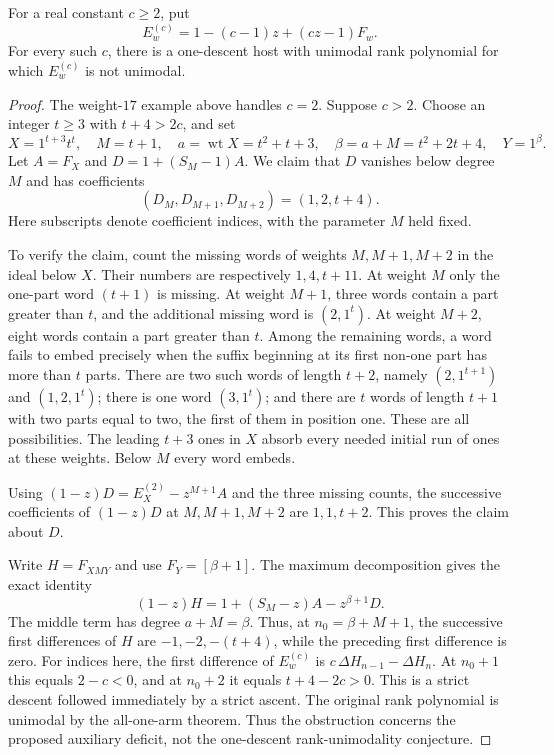 \begin{theorem}
For a real constant $c\ge2$, put
\[
 E^{(c)}_w=1-(c-1)z+(cz-1)F_w.
\]
For every such $c$, there is a one-descent host with unimodal rank
polynomial for which $E^{(c)}_w$ is not unimodal.
\end{theorem}
\begin{proof}
The weight-$17$ example above handles $c=2$. Suppose $c>2$.
Choose an integer $t\ge3$ with $t+4>2c$, and set
\[
 X=1^{t+3}t^t,\quad M=t+1,\quad
 a=\operatorname{wt}X=t^2+t+3,\quad
 \beta=a+M=t^2+2t+4,\quad Y=1^\beta.
\]
Let $A=F_X$ and $D=1+(S_M-1)A$. We claim that $D$ vanishes
below degree $M$ and has coefficients
\[
 (D_M,D_{M+1},D_{M+2})=(1,2,t+4).
\]
Here subscripts denote coefficient indices, with the parameter
$M$ held fixed.

To verify the claim, count the missing words of weights
$M,M+1,M+2$ in the ideal below $X$. Their numbers are respectively
$1,4,t+11$. At weight $M$ only the one-part word $(t+1)$ is
missing. At weight $M+1$, three words contain a part greater than
$t$, and the additional missing word is $(2,1^t)$.
At weight $M+2$, eight words contain a part greater than $t$.
Among the remaining words, a word fails to embed precisely when
the suffix beginning at its first non-one part has more than $t$
parts. There are two such words of length $t+2$, namely
$(2,1^{t+1})$ and $(1,2,1^t)$; there is one word $(3,1^t)$;
and there are $t$ words of length $t+1$ with two parts equal to
two, the first of them in position one. These are all possibilities.
The leading $t+3$ ones in $X$ absorb every needed initial run of
ones at these weights. Below $M$ every word embeds.

Using $(1-z)D=E^{(2)}_X-z^{M+1}A$ and the three missing counts,
the successive coefficients of $(1-z)D$ at $M,M+1,M+2$ are
$1,1,t+2$. This proves the claim about $D$.

Write $H=F_{XMY}$ and use $F_Y=[\beta+1]$. The maximum
decomposition gives the exact identity
\[
 (1-z)H=1+(S_M-z)A-z^{\beta+1}D.
\]
The middle term has degree $a+M=\beta$. Thus, at
$n_0=\beta+M+1$, the successive first differences of $H$ are
$-1,-2,-(t+4)$, while the preceding first difference is zero.
For indices here, the first difference of $E^{(c)}_w$ is
$c\,\Delta H_{n-1}-\Delta H_n$. At $n_0+1$ this equals
$2-c<0$, and at $n_0+2$ it equals $t+4-2c>0$. This is a
strict descent followed immediately by a strict ascent.
The original rank polynomial is unimodal by the all-one-arm
theorem. Thus the obstruction concerns the proposed auxiliary
deficit, not the one-descent rank-unimodality conjecture.
\end{proof}
